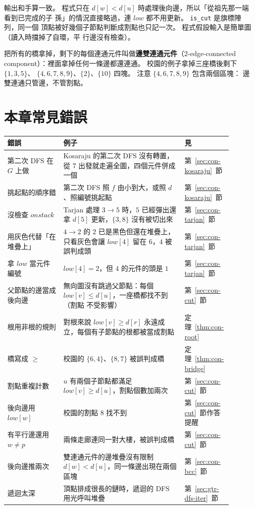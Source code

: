 輸出和手算一致。 程式只在 $d[w] < d[u]$ 時處理後向邊，所以「從祖先那一端看到已完成的子
孫」的情況直接略過，連 $\mathit{low}$ 都不用更新。 \texttt{is\_cut} 是旗標陣列，同一個
頂點被好幾個子節點判斷成割點也只記一次。 程式假設輸入是簡單圖（讀入時擋掉了自環，平
行邊沒有檢查）。

把所有的橋拿掉，剩下的每個連通元件叫做\textbf{邊雙連通元件}（2-edge-connected
component）：裡面拿掉任何一條邊都還連通。 校園的例子拿掉三座橋後剩下 $\{1, 3, 5\}$、
$\{4, 6, 7, 8, 9\}$、$\{2\}$、$\{10\}$ 四塊。 注意 $\{4, 6, 7, 8, 9\}$ 包含兩個區塊：
邊雙連通只管邊，不管割點。

\section{本章常見錯誤}
\label{sec:con-pitfalls}

\begin{center}
\small
\begin{tabular}{>{\raggedright\arraybackslash}p{0.24\linewidth}>{\raggedright\arraybackslash}p{0.52\linewidth}>{\raggedright\arraybackslash}p{0.14\linewidth}}
\toprule
錯誤 & 例子 & 見 \\
\midrule
第二次 DFS 在 $G$ 上做 & Kosaraju 的第二次 DFS 沒有轉置，從 $7$ 出發就走遍全圖，四個元件併成一個 &
第~\ref{sec:con-kosaraju}~節 \\
挑起點的順序錯 & 第二次 DFS 照 $f$ 由小到大，或照 $d$、照編號挑起點 & 第~\ref{sec:con-kosaraju}~節 \\
沒檢查 $\mathit{onstack}$ & Tarjan 處理 $3 \to 5$ 時，$5$ 已經彈出還拿 $d[5]$ 更新，$\{3, 8\}$ 沒有被切出來 &
第~\ref{sec:con-tarjan}~節 \\
用灰色代替「在堆疊上」 & $4 \to 2$ 的 $2$ 已是黑色但還在堆疊上，只看灰色會讓 $\mathit{low}[4]$ 留在
$6$，$4$ 被誤判成頭 & 第~\ref{sec:con-tarjan}~節 \\
拿 $\mathit{low}$ 當元件編號 & $\mathit{low}[4] = 2$，但 $4$ 的元件的頭是 $1$ & 第~\ref{sec:con-tarjan}~節 \\
父節點的邊當成後向邊 & 無向圖沒有跳過父節點：每個 $\mathit{low}[v] \le d[u]$，一座橋都找不到（割點
不受影響） & 第~\ref{sec:con-cut}~節 \\
根用非根的規則 & 對根來說 $\mathit{low}[v] \ge d[r]$ 永遠成立，每個有子節點的根都被當成割點 &
定理~\ref{thm:con-root} \\
橋寫成 $\ge$ & 校園的 $\{6, 4\}$、$\{8, 7\}$ 被誤判成橋 & 定理~\ref{thm:con-bridge} \\
割點重複計數 & $u$ 有兩個子節點都滿足 $\mathit{low}[v] \ge d[u]$，割點個數加兩次 &
第~\ref{sec:con-cut}~節 \\
後向邊用 $\mathit{low}[w]$ & 校園的割點 $8$ 找不到 & 第~\ref{sec:con-cut}~節作答提醒 \\
有平行邊還用 $w \ne p$ & 兩條走廊連同一對大樓，被誤判成橋 & 第~\ref{sec:con-cut}~節 \\
後向邊推兩次 & 雙連通元件的邊堆疊沒有限制 $d[w] < d[u]$，同一條邊出現在兩個區塊 &
第~\ref{sec:con-bcc}~節 \\
遞迴太深 & 頂點排成很長的鏈時，遞迴的 DFS 用光呼叫堆疊 & 第~\ref{sec:gtr-dfs-iter}~節 \\
\bottomrule
\end{tabular}
\end{center}

